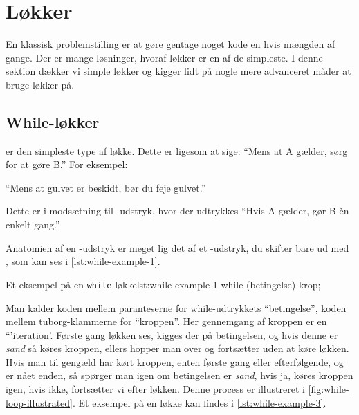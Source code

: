 \section{Løkker}

    En klassisk problemstilling er at gøre gentage noget kode en hvis
    mængden af gange. Der er mange løsninger, hvoraf løkker er en af
    de simpleste. I denne sektion dækker vi simple løkker og kigger
    lidt på nogle mere advanceret måder at bruge løkker på.

	\subsection{While-løkker}

         er den simpleste type af løkke. Dette er ligesom at
		sige: ``Mens at A gælder, sørg for at gøre B.'' For eksempel:

		``Mens at gulvet er beskidt, bør du feje gulvet.''

		Dette er i modsætning til -udstryk, hvor der udtrykkes
		``Hvis A gælder, gør B èn enkelt gang.''

		Anatomien af en -udstryk er meget lig det af et
		-udstryk, du skifter bare  ud med
		, som kan ses i \autoref{lst:while-example-1}.

		\begin{JavaCode}{Et eksempel på en \texttt{while}-løkke}{lst:while-example-1}
			while (betingelse) {
				krop;
			}
		\end{JavaCode}

        Man kalder koden mellem paranteserne for while-udtrykkets
        ``betingelse'', koden mellem tuborg-klammerne for ``kroppen''.
        Her gennemgang af kroppen er en ``'iteration'.  Første gang
        løkken ses, kigges der på betingelsen, og hvis denne er
        \emph{sand} så køres kroppen, ellers hopper man over og
        fortsætter uden at køre løkken. Hvis man til gengæld har kørt
        kroppen, enten første gang eller efterfølgende, og er nået
        enden, så spørger man igen om betingelsen er \emph{sand}, hvis
        ja, køres kroppen igen, hvis ikke, fortsætter vi efter løkken.
        Denne process er illustreret i
        \autoref{fig:while-loop-illustrated}. Et eksempel på en
        løkke kan findes i \autoref{lst:while-example-3}.



